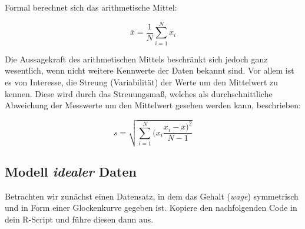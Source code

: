 \documentclass[]{article}
\begin{document}
Formal berechnet sich das arithmetische Mittel:

\begin{equation} 
  \bar{x} = \frac{1}{N} \sum_{i=1}^{N} x_i
  \label{eq:MW}
\end{equation}

Die Aussagekraft des arithmetischen Mittels beschränkt sich jedoch ganz
wesentlich, wenn nicht weitere Kennwerte der Daten bekannt sind. Vor
allem ist es von Interesse, die Streung (Variabilität) der Werte um den
Mittelwert zu kennen. Diese wird durch das Streuungsmaß, welches als
durchschnittliche Abweichung der Messwerte um den Mittelwert gesehen
werden kann, beschrieben:

\begin{equation} 
  s = \sqrt{\sum_{i=1}^{N} (x_i \frac{x_i - \bar{x})^2}{N-1}}
  \label{eq:SD}
\end{equation}

\subsection*{\texorpdfstring{Modell \emph{idealer}
Daten}{Modell idealer Daten}}\label{modell-idealer-daten}

Betrachten wir zunächst einen Datensatz, in dem das Gehalt (\emph{wage})
symmetrisch und in Form einer Glockenkurve gegeben ist. Kopiere den
nachfolgenden Code in dein R-Script und führe diesen dann aus.
\end{document}
